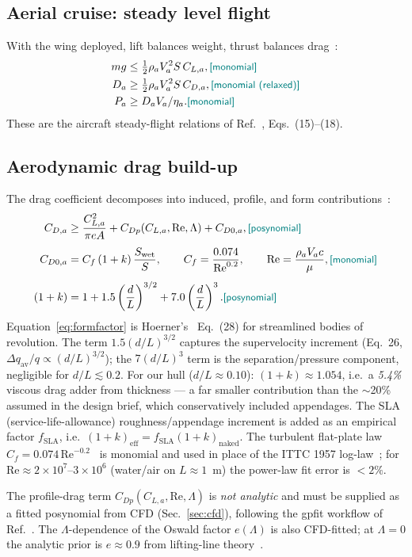 \documentclass[conf]{new-aiaa}
\newcommand{\gpc}[1]{\textcolor{teal}{\small\textsf{[#1]}}} %
\begin{document}
\subsection{Aerial cruise: steady level flight}
With the wing deployed, lift balances weight, thrust balances drag~\cite{hoburg2014geometric}:
\begin{align}
m g &\le \tfrac12\rho_a V_a^2 S\,C_{L,a}, \gpc{monomial} \\
D_a &\ge \tfrac12\rho_a V_a^2 S\,C_{D,a}, \gpc{monomial (relaxed)} \\
P_a &\ge D_a V_a / \eta_a. \gpc{monomial}
\end{align}
These are the aircraft steady-flight relations of Ref.~\cite{hoburg2014geometric}, Eqs.~(15)--(18).

\subsection{Aerodynamic drag build-up}
The drag coefficient decomposes into induced, profile, and form
contributions~\cite{hoburg2014geometric,hoerner1965fluid}:
\begin{align}
C_{D,a} &\ge \frac{C_{L,a}^2}{\pi e A}
           + C_{Dp}(C_{L,a},\mathrm{Re},\Lambda)
           + C_{D0,a}, \gpc{posynomial}\\[4pt]
C_{D0,a} &= C_f\,(1+k)\,\frac{S_{\text{wet}}}{S},
           \qquad C_f = \frac{0.074}{\mathrm{Re}^{0.2}},
           \qquad \mathrm{Re} = \frac{\rho_a V_a c}{\mu}, \gpc{monomial}\\[4pt]
(1+k) &= 1 + 1.5\left(\frac{d}{L}\right)^{3/2}
        +     7.0\left(\frac{d}{L}\right)^{3}. \gpc{posynomial}\label{eq:formfactor}
\end{align}
Equation~\eqref{eq:formfactor} is Hoerner's~\cite{hoerner1965fluid} Eq.~(28) for streamlined bodies of
revolution. The term $1.5(d/L)^{3/2}$ captures the supervelocity increment (Eq.~26, $\Delta q_{\text{av}}/q
\propto(d/L)^{3/2}$); the $7(d/L)^3$ term is the separation/pressure component, negligible for
$d/L\lesssim0.2$. For our hull ($d/L\approx0.10$): $(1+k)\approx1.054$, i.e.\ a
\emph{5.4\%} viscous drag adder from thickness — a far smaller contribution than the $\sim$20\%
assumed in the design brief, which conservatively included appendages. The SLA (service-life-allowance)
roughness/appendage increment is added as an empirical factor $f_{\text{SLA}}$, i.e.\
$(1+k)_{\text{eff}}=f_{\text{SLA}}(1+k)_{\text{naked}}$. The turbulent flat-plate law
$C_f=0.074\,\mathrm{Re}^{-0.2}$~\cite{hoburg2014geometric} is monomial and used in place of the ITTC
1957 log-law~\cite{myring1976theoretical,allen2000propulsion}; for $\mathrm{Re}\approx
2\times10^{7}$--$3\times10^{6}$ (water/air on $L\approx 1$~m) the power-law fit error is $<2\%$.\par
The profile-drag term $C_{Dp}(C_{L,a},\mathrm{Re},\Lambda)$ is \emph{not analytic} and must be supplied
as a fitted posynomial from CFD (Sec.~\ref{sec:cfd}), following the gpfit workflow of
Ref.~\cite{hoburg2016data}. The $\Lambda$-dependence of the Oswald factor $e(\Lambda)$ is also CFD-fitted;
at $\Lambda=0$ the analytic prior is $e\approx0.9$ from lifting-line theory~\cite{hoerner1985fluid}.
\end{document}
